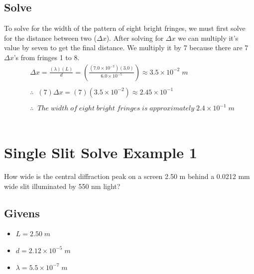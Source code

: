 \documentclass{article}
\begin{document}
\subsection*{Solve}
To solve for the width of the pattern of eight bright fringes, we must first solve for the distance between two ($\Delta x$). After solving for $\Delta x$ we can multiply it's value by seven to get the final distance. We multiply it by 7 because there are 7 $\Delta x$'s from fringes 1 to 8.\\
\begin{align*}
     & \Delta x = \frac{(\lambda)(L)}{d} = \left(\frac{(7.0 \times 10^{-7})(3.0)}{6.0 \times 10^{-5}}\right) \approx 3.5 \times 10^{-2}\;m \\\\
     & \therefore\;\;(7)\Delta x = (7)(3.5 \times 10^{-2}) \approx 2.45 \times 10^{-1}                                                     \\\\
     & \therefore\;\;The\;width\;of\;eight\;bright\;fringes\;is\;approximately\;2.4 \times 10^{-1}\;m
\end{align*}\leavevmode\\

\section*{Single Slit Solve Example 1}
How wide is the central diffraction peak on a screen 2.50 m behind a 0.0212 mm wide slit illuminated by 550 nm light?
\subsection*{Givens}
\begin{itemize}
    \item $L = 2.50\;m$
    \item $d = 2.12 \times 10^{-5}\;m$
    \item $\lambda = 5.5 \times 10^{-7}\;m$
\end{itemize}\leavevmode
\end{document}
